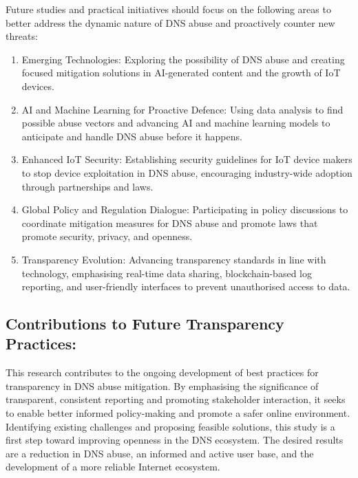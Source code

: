 Future studies and practical initiatives should focus on the following areas to better address the dynamic nature of DNS abuse and proactively counter new threats:

\begin{enumerate}
    \item Emerging Technologies: Exploring the possibility of DNS abuse and creating focused mitigation solutions in AI-generated content and the growth of IoT devices.

    \item AI and Machine Learning for Proactive Defence: Using data analysis to find possible abuse vectors and advancing AI and machine learning models to anticipate and handle DNS abuse before it happens.

    \item Enhanced IoT Security: Establishing security guidelines for IoT device makers to stop device exploitation in DNS abuse, encouraging industry-wide adoption through partnerships and laws.

    \item Global Policy and Regulation Dialogue: Participating in policy discussions to coordinate mitigation measures for DNS abuse and promote laws that promote security, privacy, and openness.

    \item Transparency Evolution: Advancing transparency standards in line with technology, emphasising real-time data sharing, blockchain-based log reporting, and user-friendly interfaces to prevent unauthorised access to data.

    
\end{enumerate}


\subsection{Contributions to Future Transparency Practices:}

This research contributes to the ongoing development of best practices for transparency in DNS abuse mitigation. By emphasising the significance of transparent, consistent reporting and promoting stakeholder interaction, it seeks to enable better informed policy-making and promote a safer online environment. Identifying existing challenges and proposing feasible solutions, this study is a first step toward improving openness in the DNS ecosystem. The desired results are a reduction in DNS abuse, an informed and active user base, and the development of a more reliable Internet ecosystem.


